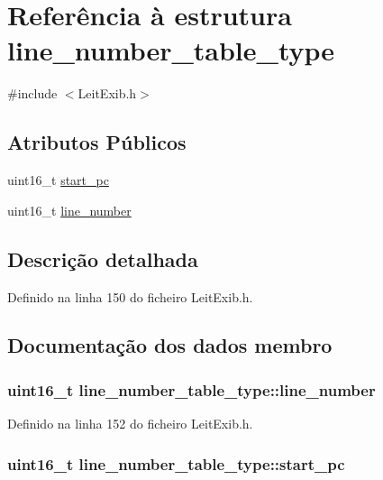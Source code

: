 \hypertarget{structline__number__table__type}{\section{Referência à estrutura line\-\_\-number\-\_\-table\-\_\-type}
\label{structline__number__table__type}
}


{\ttfamily \#include $<$Leit\-Exib.\-h$>$}

\subsection*{Atributos Públicos}
\begin{DoxyCompactItemize}
\item 
uint16\-\_\-t \hyperlink{structline__number__table__type_a5b5fc96901fd52be22ddc5115633ed3c}{start\-\_\-pc}
\item 
uint16\-\_\-t \hyperlink{structline__number__table__type_a85fe37c92e96597234cdfdad035f1ae4}{line\-\_\-number}
\end{DoxyCompactItemize}


\subsection{Descrição detalhada}


Definido na linha 150 do ficheiro Leit\-Exib.\-h.



\subsection{Documentação dos dados membro}
\hypertarget{structline__number__table__type_a85fe37c92e96597234cdfdad035f1ae4}{
\subsubsection[{line\-\_\-number}]{\setlength{\rightskip}{0pt plus 5cm}uint16\-\_\-t line\-\_\-number\-\_\-table\-\_\-type\-::line\-\_\-number}}\label{structline__number__table__type_a85fe37c92e96597234cdfdad035f1ae4}


Definido na linha 152 do ficheiro Leit\-Exib.\-h.

\hypertarget{structline__number__table__type_a5b5fc96901fd52be22ddc5115633ed3c}{
\subsubsection[{start\-\_\-pc}]{\setlength{\rightskip}{0pt plus 5cm}uint16\-\_\-t line\-\_\-number\-\_\-table\-\_\-type\-::start\-\_\-pc}}\label{structline__number__table__type_a5b5fc96901fd52be22ddc5115633ed3c}



